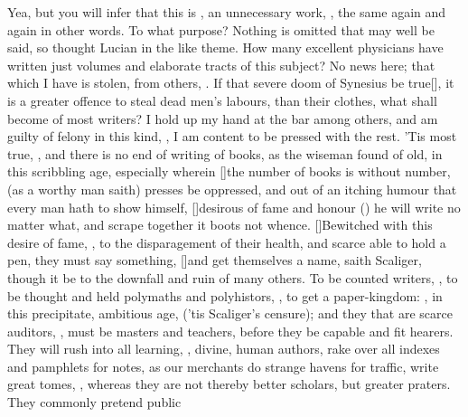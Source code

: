 {Yea, but you will infer that this is , an unnecessary
work, , the same again and again in other
words. To what purpose? Nothing is omitted that may well be said,
so thought Lucian in the like theme. How many excellent physicians have
written just volumes and elaborate tracts of this subject? No news
here; that which I have is stolen, from others, . If that severe doom of Synesius be true[\baselineskip], it is a
greater offence to steal dead men's labours, than their clothes, what
shall become of most writers? I hold up my hand at the bar among
others, and am guilty of felony in this kind, , I
am content to be pressed with the rest. 'Tis most true, , and there is no end of
writing of books, as the wiseman found of old, in this scribbling
age, especially wherein [\baselineskip]the number of books is without number, (as
a worthy man saith) presses be oppressed, and out of an itching humour
that every man hath to show himself, [\baselineskip]desirous of fame and honour
() he will write no matter what, and scrape
together it boots not whence. [\baselineskip]Bewitched with this desire of fame,
, to the disparagement of their health, and
scarce able to hold a pen, they must say something, [\baselineskip]and get
themselves a name, saith Scaliger, though it be to the downfall and
ruin of many others. To be counted writers, ,
to be thought and held polymaths and polyhistors, , to get a paper-kingdom: , in this precipitate, ambitious age,  ('tis
Scaliger's censure); and they that are scarce auditors, , must be masters and teachers, before they be capable and fit
hearers. They will rush into all learning, , divine,
human authors, rake over all indexes and pamphlets for notes, as our
merchants do strange havens for traffic, write great tomes, , whereas they are not thereby
better scholars, but greater praters. They commonly pretend public
}
